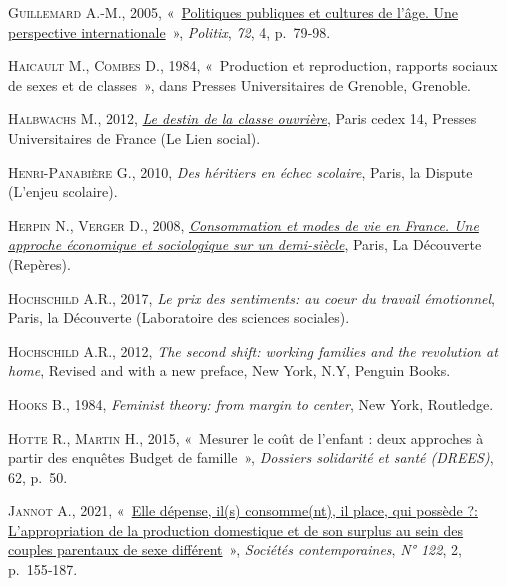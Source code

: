 \documentclass[
  12pt,
]{book}
\newlength{\cslhangindent}
\newenvironment{CSLReferences}[2] %
 {\begin{list}{}{%
  \setlength{\itemindent}{0pt}
  \setlength{\leftmargin}{0pt}
  \setlength{\parsep}{0pt}
  \ifodd #1
   \setlength{\leftmargin}{\cslhangindent}
   \setlength{\itemindent}{-1\cslhangindent}
  \fi
  \setlength{\itemsep}{#2\baselineskip}}}
 {\end{list}}
\begin{document}
\begin{CSLReferences}{0}{1}
\textsc{Guillemard A.-M.}, 2005,
{«~\href{https://doi.org/10.3917/pox.072.0079}{Politiques publiques et
cultures de l'âge. Une perspective internationale}~»}, \emph{Politix},
\emph{72}, 4, p.~79‑98.

\textsc{Haicault M.}, \textsc{Combes D.}, 1984, {«~Production et
reproduction, rapports sociaux de sexes et de classes~»}, dans Presses
Universitaires de Grenoble, Grenoble.

\textsc{Halbwachs M.}, 2012,
\emph{\href{https://www.cairn.info/le-destin-de-la-classe-ouvriere--9782130585909.htm}{Le
destin de la classe ouvrière}}, Paris cedex 14, Presses Universitaires
de France (Le Lien social).

\textsc{Henri-Panabière G.}, 2010, \emph{Des héritiers en échec
scolaire}, Paris, la Dispute (L'enjeu scolaire).

\textsc{Herpin N.}, \textsc{Verger D.}, 2008,
\emph{\href{https://www.cairn.info/consommation-et-modes-de-vie-en-france--9782707156655.htm}{Consommation
et modes de vie en France. Une approche économique et sociologique sur
un demi-siècle}}, Paris, La Découverte (Repères).

\textsc{Hochschild A.R.}, 2017, \emph{Le prix des sentiments: au coeur
du travail émotionnel}, Paris, la Découverte (Laboratoire des sciences
sociales).

\textsc{Hochschild A.R.}, 2012, \emph{The second shift: working families
and the revolution at home}, Revised and with a new preface, New York,
N.Y, Penguin Books.

\textsc{Hooks B.}, 1984, \emph{Feminist theory: from margin to center},
New York, Routledge.

\textsc{Hotte R.}, \textsc{Martin H.}, 2015, {«~Mesurer le coût de
l{'}enfant : deux approches à partir des enquêtes Budget de famille~»},
\emph{Dossiers solidarité et santé (DREES)}, 62, p.~50.

\textsc{Jannot A.}, 2021,
{«~\href{https://doi.org/10.3917/soco.122.0155}{Elle dépense, il(s)
consomme(nt), il place, qui possède ?: L'appropriation de la production
domestique et de son surplus au sein des couples parentaux de sexe
différent}~»}, \emph{Sociétés contemporaines}, \emph{N° 122}, 2,
p.~155‑187.


\end{CSLReferences}
\end{document}

